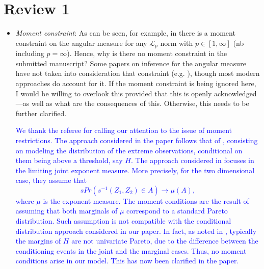 \documentclass[10pt]{article}
\newcommand{\comment}[1]{\textcolor{teal}{#1}}
\newcommand{\response}[1]{\textcolor{blue}{#1}}
\begin{document}
\section*{Review 1}
\begin{itemize}
\item \emph{Moment constraint}: As can be seen, for example, in \cite[Equation 4.1]{einmahl2009}
    there is a moment constraint on the angular measure for any $\mathcal{L}_p$ norm with 
    $p \in [1, \infty]$ (nb including $p = \infty$).  Hence, why is there no moment constraint in 
    the submitted 
    manuscript? Some papers on inference for the angular measure have not taken into consideration 
    that constraint (e.g. \cite{einmahl2001}), though most modern approaches do account for it. If 
    the moment constraint is being ignored here, I would be willing to overlook this provided that 
    this is openly acknowledged---as well as what are the consequences of this. Otherwise, this needs 
    to be further clarified.

    
\response{We thank the referee for calling our attention to
    the issue of moment restrictions. The approach considered in the
    paper follows that of \cite{rootzen2018}, consisting on modeling the
    distribution of the extreme observations, conditional on them being
    above a threshold, say $H$.  The approach considered in
    \cite{EiSe2009} focuses in the limiting joint exponent measure. More
    precisely, for the two dimensional case, they assume that
    \[
        sPr(s^{-1}(Z_1,Z_2) \in A) \rightarrow \mu(A),
    \]
    where $\mu$ is the exponent measure. The moment conditions are
    the result of assuming that both marginals of $\mu$ correspond to a
    standard Pareto distribution. Such assumption is not compatible
    with the conditional distribution approach considered in our paper.
    In fact, as noted in \cite{KiRoSeWa2019}, typically the margins of
    $H$ are not univariate Pareto, due to the difference between the 
    conditioning events in the joint and the marginal cases. Thus, no
    moment conditions arise in our model. This has now been clarified in the paper.
    }


\end{itemize}
\end{document}
